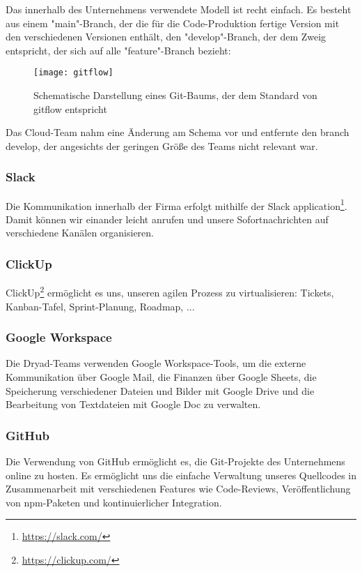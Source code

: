 Das innerhalb des Unternehmens verwendete Modell ist recht einfach. Es besteht aus einem "main"-Branch, der die für die Code-Produktion fertige Version mit den verschiedenen Versionen enthält, den "develop"-Branch, der dem Zweig entspricht, der sich auf alle "feature"-Branch bezieht:

\begin{figure}[h]
  \centering
  \texttt{[image: gitflow]}
  \caption{Schematische Darstellung eines Git-Baums, der dem Standard von gitflow entspricht}
\end{figure}

Das Cloud-Team nahm eine Änderung am Schema vor und entfernte den branch develop, der angesichts der geringen Größe des Teams nicht relevant war.

\subsubsection{Slack}
Die Kommunikation innerhalb der Firma erfolgt mithilfe der Slack application\footnote{\href{https://slack.com/}{https://slack.com/}}.
Damit können wir einander leicht anrufen und unsere Sofortnachrichten auf verschiedene Kanälen organisieren.

\subsubsection{ClickUp} \label{sec:clickup}

ClickUp\footnote{\href{https://clickup.com/}{https://clickup.com/}} ermöglicht es uns, unseren agilen Prozess zu virtualisieren:
Tickets, Kanban-Tafel, Sprint-Planung, Roadmap, ...

\subsubsection{Google Workspace}

Die Dryad-Teams verwenden Google Workspace-Tools, um die externe Kommunikation über Google Mail, die Finanzen über Google Sheets, die Speicherung verschiedener Dateien und Bilder mit Google Drive und die Bearbeitung von Textdateien mit Google Doc zu verwalten.

\subsubsection{GitHub}

Die Verwendung von GitHub ermöglicht es, die Git-Projekte des Unternehmens online zu hosten.
Es ermöglicht uns die einfache Verwaltung unseres Quellcodes in Zusammenarbeit mit verschiedenen Features wie Code-Reviews, Veröffentlichung von npm-Paketen und kontinuierlicher Integration.


